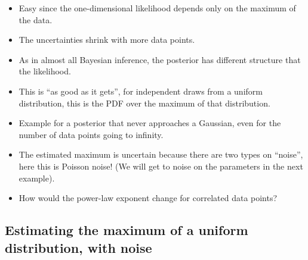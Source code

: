 \documentclass[12pt,a4paper]{article}
\begin{document}
\begin{tcolorbox}[notebox, title={Summary}]
\begin{itemize}
    \item Easy since the one-dimensional likelihood depends only on the maximum of the data. 
    \item The uncertainties shrink with more data points. 
    \item As in almost all Bayesian inference, the posterior has different structure that the likelihood. 
    \item This is ``as good as it gets'', for independent draws from a uniform distribution, this is the PDF over the maximum of that distribution. 
    \item Example for a posterior that never approaches a Gaussian, even for the number of data points going to infinity.
    \item The estimated maximum is uncertain because there are two types on ``noise'', here this is Poisson noise! (We will get to noise on the parameters in the next example).
\end{itemize}
\end{tcolorbox}

\begin{tcolorbox}[notebox, title={Question}]
\begin{itemize}
    \item How would the power-law exponent change for correlated data points?
\end{itemize}
\end{tcolorbox}

\subsection{Estimating the maximum of a uniform distribution, with noise}
\end{document}
